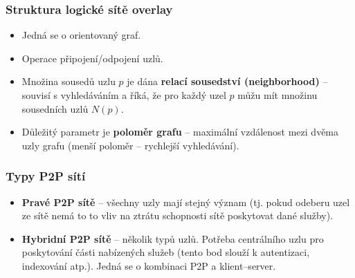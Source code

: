 \documentclass[11pt,a4paper]{article}
\begin{document}
\subsubsection{Struktura logické sítě overlay}
\begin{itemize}
\item Jedná se o orientovaný graf.
\item Operace připojení/odpojení uzlů.
\item Množina sousedů uzlu $p$ je dána \textbf{relací sousedství (neighborhood)} -- souvisí s vyhledáváním a říká, že pro každý uzel $p$ můžu mít množinu sousedních uzlů $N(p)$.
\item Důležitý parametr je \textbf{poloměr grafu} -- maximální vzdálenost mezi dvěma uzly grafu (menší poloměr -- rychlejší vyhledávání).
\end{itemize}
\subsubsection{Typy P2P sítí}
\begin{itemize}
\item \textbf{Pravé P2P sítě} -- všechny uzly mají stejný význam (tj. pokud odeberu uzel ze sítě nemá to to vliv na ztrátu schopnosti sítě poskytovat dané služby).
\item \textbf{Hybridní P2P sítě} -- několik typů uzlů. Potřeba centrálního uzlu pro poskytování části nabízených služeb (tento bod slouží k autentizaci, indexování atp.). Jedná se o kombinaci P2P a klient--server.
\end{itemize}
\end{document}

